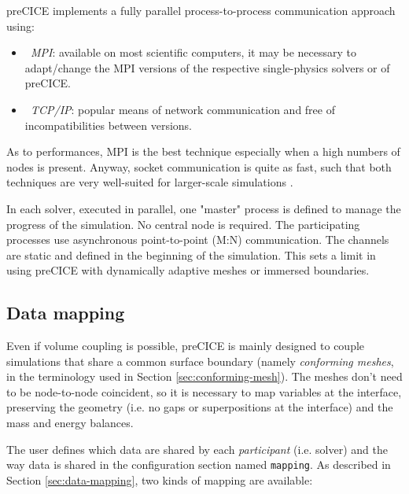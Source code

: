 preCICE implements a fully parallel process-to-process communication approach \cite{Shukaev2015} using:

\begin{itemize}
	\item \textit{~\ac{MPI}}: available on 	most scientific computers, it may be necessary to adapt/change the MPI versions of the respective single-physics solvers or of preCICE.
	\item \textit{~\ac{TCP/IP}}: popular means of network communication and free of incompatibilities between versions.
\end{itemize}

As to performances, MPI is the best technique especially when a high numbers of nodes is present. Anyway, socket communication is quite as fast, such that
both techniques are very well-suited for larger-scale simulations \cite{gatzhammer2014efficient}.

In each solver, executed in parallel, one "master" process is defined to manage the progress of the simulation. No central node is required. The participating
processes use asynchronous point-to-point (M:N) communication. The channels are static and defined in the beginning of the simulation. This sets a limit in using preCICE with dynamically adaptive meshes or immersed boundaries.

\subsection{Data mapping}
\label{sec:pc-map}

Even if volume coupling is possible, preCICE is mainly designed to couple simulations that share a common surface boundary (namely \textit{conforming meshes}, in the terminology used in Section \ref{sec:conforming-mesh}). The meshes don't need to be node-to-node coincident, so it is necessary to map variables at the interface, preserving the geometry (i.e. no gaps or superpositions at the interface) and the mass and energy balances. 

The user defines which data are shared by each \textit{participant} (i.e. solver) and the way data is shared in the configuration section named \texttt{mapping}. As described in Section \ref{sec:data-mapping}, two kinds of mapping are available:

